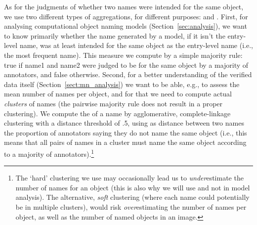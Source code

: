 As for the judgments of whether two names were intended for the same object, we use two different types of aggregations, for different purposes: \sameobject and \cluster.
First, for analysing computational object naming models (Section~\ref{sec:analysis}), 
we want to know primarily whether the name generated by a model, if it isn't the entry-level name, was at least intended for the same object as the entry-level name (i.e., the most frequent name).
This \textbf{\sameobject} measure we compute by a simple majority rule: true if name1 and name2 were judged to be for the same object by a majority of annotators, and false otherwise.
Second, for a better understanding of the verified \mn data itself (Section~\ref{sect:mn_analysis}) we want to be able, e.g., to assess the mean number of names per object, and for that we need to compute actual \emph{clusters} of names (the pairwise majority rule does not result in a proper clustering). 
We compute the \textbf{\cluster} of a name by agglomerative, complete-linkage clustering with a distance threshold of .5, using as distance between two names the proportion of annotators saying they do not name the same object (i.e., this means that all pairs of names in a cluster must name the same object according to a majority of annotators).\footnote{
	The `hard' clustering we use may occasionally lead us to \emph{under}estimate the number of names for an object (this is also why we will use \sameobject and not \cluster in model analysis). The alternative, \emph{soft} clustering (where each name could potentially be in multiple clusters), would risk \emph{over}estimating the number of names per object, as well as the number of named objects in an image.
}





